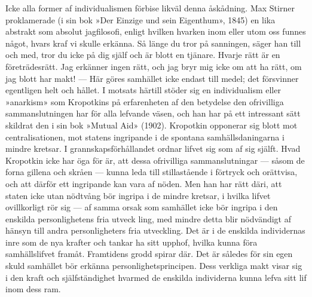 \documentclass[12pt]{article}
\newcommand{\opage}[1]{\marginnote{\footnotesize\textit{[#1]}}}
\begin{document}
Icke alla former af individualismen förbise likväl denna åskådning. Max Stirner proklamerade (i sin bok »Der Einzige und sein Eigenthum», 1845) en lika abstrakt som absolut jagfilosofi, enligt hvilken hvarken inom eller utom oss funnes något, hvars kraf vi skulle erkänna. Så länge du tror på sanningen, %
\opage{45}
säger han till och med, tror du icke på dig själf och är blott en tjänare. Hvarje rätt är en företrädesrätt. Jag erkänner ingen rätt, och jag bryr mig icke om att ha rätt, om jag blott har makt! --- Här göres samhället icke endast till medel; det försvinner egentligen helt och hållet. I motsats härtill stöder sig en individualism eller »anarkism» som Kropotkins på erfarenheten af den betydelse den ofrivilliga sammanslutningen har för alla lefvande väsen, och han har på ett intressant sätt skildrat den i sin bok »Mutual Aid» (1902). Kropotkin opponerar sig blott mot centralisationen, mot statens ingripande i de spontana samhällsdaningarna i mindre kretsar. I grannskapsförhållandet ordnar lifvet sig som af sig själft. Hvad Kropotkin icke har öga för är, att dessa ofrivilliga sammanslutningar --- såsom de forna gillena och skråen --- kunna leda till stillastående i förtryck och orättvisa, och att därför ett ingripande kan vara af nöden. Men han har rätt däri, att staten icke utan nödtvång bör ingripa i de mindre kretsar, i hvilka lifvet ovillkorligt rör sig --- af samma orsak som samhället icke bör ingripa i den enskilda personlighetens fria utveck%
\opage{46}
ling, med mindre detta blir nödvändigt af hänsyn till andra personligheters fria utveckling. Det är i de enskilda individernas inre som de nya krafter och tankar ha sitt upphof, hvilka kunna föra samhällslifvet framåt. Framtidens grodd spirar där. Det är således för sin egen skuld samhället bör erkänna personlighetsprincipen. Dess verkliga makt visar sig i den kraft och själfständighet hvarmed de enskilda individerna kunna lefva sitt lif inom dess ram. 
\end{document}

